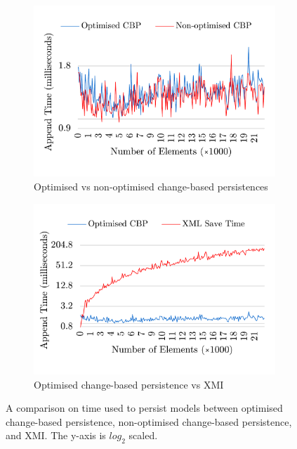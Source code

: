\documentclass[12pt, a4paper]{report} \usepackage[titletoc]{appendix}
\begin{document}
\begin{figure}[ht]	
	\begin{subfigure}[t]{0.5\linewidth}
		\includegraphics[width=\linewidth]{append_speed_conf}
		\caption{Optimised vs non-optimised change-based persistences}\label{fig:append_speed_conf}
	\end{subfigure}
	\hfill
	\begin{subfigure}[t]{0.5\linewidth}
		\includegraphics[width=\linewidth]{append_speed_conf_ocbp_xmi}
		\caption{Optimised change-based persistence vs XMI}\label{fig:append_speed_conf_ochange-based persistence_xmi}		
	\end{subfigure}	
	\caption{A comparison on time used to persist models between optimised change-based persistence, non-optimised change-based persistence, and XMI. The y-axis is $log_2$ scaled.}
	\label{fig:append_speed}
\end{figure}
\end{document}
